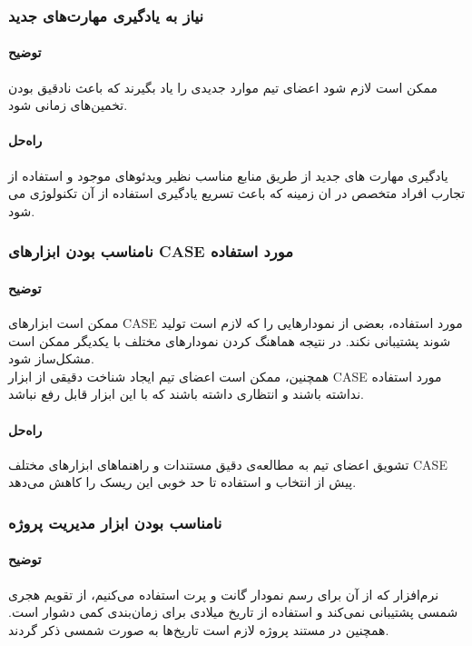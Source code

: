 \subsubsection{نیاز به یادگیری مهارت‌های جدید}
\paragraph{توضیح}
ممکن است لازم شود اعضای تیم موارد جدیدی را یاد بگیرند که باعث نادقیق بودن تخمین‌های زمانی شود.
\paragraph{راه‌حل}
یادگیری مهارت های جدید از طریق منابع مناسب نظیر ویدئوهای موجود و استفاده از تجارب افراد متخصص در ان زمینه که باعث تسریع یادگیری استفاده از آن تکنولوژی می شود.
\subsubsection{نامناسب بودن ابزارهای CASE مورد استفاده}
\paragraph{توضیح}
ممکن است ابزارهای CASE مورد استفاده، بعضی از نمودارهایی را که لازم است تولید شوند پشتیبانی نکند. در نتیجه هماهنگ کردن نمودارهای مختلف با یکدیگر ممکن است مشکل‌ساز شود.\\
همچنین، ممکن است اعضای تیم ایجاد شناخت دقیقی از ابزار CASE مورد استفاده نداشته باشند و انتظاری داشته باشند که با این ابزار قابل رفع نباشد.
\paragraph{راه‌حل}
تشویق اعضای تیم به مطالعه‌ی دقیق مستندات و 
راهنماهای ابزارهای مختلف CASE پیش از انتخاب و استفاده تا حد خوبی این ریسک را کاهش می‌دهد.
\subsubsection{نامناسب بودن ابزار مدیریت پروژه}
\paragraph{توضیح}
نرم‌افزار 
که از آن برای رسم نمودار گانت
و پرت
استفاده می‌کنیم، از تقویم هجری شمسی پشتیبانی نمی‌کند و استفاده از تاریخ میلادی برای زمان‌بندی کمی دشوار است. همچنین در مستند پروژه لازم است تاریخ‌ها به صورت شمسی ذکر گردند.
